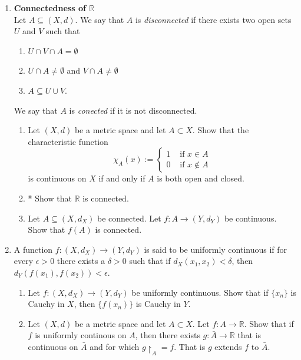 \documentclass[notoc,notitlepage]{tufte-book}
\begin{document}
\begin{enumerate}
  \item \textbf{Connectedness of $\mathbb{R}$} \\
    Let $A \subseteq (X, d)$. We say that $A$ is \textit{disconnected} if there exists two open sets $U$ and $V$ such that
    \begin{enumerate}[label=\roman*)]
      \item $U \cap V \cap A = \emptyset$
      \item $U \cap A \neq \emptyset$ and $V \cap A \neq \emptyset$
      \item $A \subseteq U \cup V$.
    \end{enumerate}
    We say that $A$ is \textit{conected} if it is not disconnected.
    \begin{enumerate}
      \item Let $(X, d)$ be a metric space and let $A \subset X$. Show that the characteristic function
        \begin{equation*}
          \chi_A(x) := \begin{cases}
            1 & \text{ if } x \in A \\
            0 & \text{ if } x \notin A
          \end{cases}
        \end{equation*}
        is continuous on $X$ if and only if $A$ is both open and closed.
      \item * Show that $\mathbb{R}$ is connected.
      \item Let $A \subseteq (X, d_X)$ be connected. Let $f : A \to (Y, d_Y)$ be continuous. Show that $f(A)$ is connected.
    \end{enumerate}

  \item A function $f : (X, d_X) \to (Y, d_Y)$ is said to be uniformly continuous if for every $\epsilon > 0$ there exists a $\delta > 0$ such that if $d_X(x_1, x_2) < \delta$, then $d_Y(f(x_1), f(x_2)) < \epsilon$.
    \begin{enumerate}
      \item Let $f : (X, d_X) \to (Y, d_Y)$ be uniformly continuous. Show that if $\{ x_n \}$ is Cauchy in $X$, then $\{ f(x_n) \}$ is Cauchy in $Y$.
      \item Let $(X, d)$ be a metric space and let $A \subset X$. Let $f : A \to \mathbb{R}$. Show that if $f$ is uniformly continous on $A$, then there exists $g : \bar{A} \to \mathbb{R}$ that is continuous on $\bar{A}$ and for which $g \restriction_A = f$. That is $g$ extends $f$ to $\bar{A}$.
    \end{enumerate}


\end{enumerate}
\end{document}
